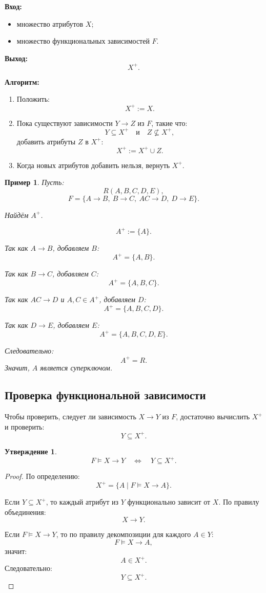 \documentclass[12pt,a4paper]{article}
\newtheorem{proposition}{Утверждение}[section]
\newtheorem{example}{Пример}[section]
\theoremstyle{remark}
\begin{document}
\textbf{Вход:}
\begin{itemize}
    \item множество атрибутов $X$;
    \item множество функциональных зависимостей $F$.
\end{itemize}

\textbf{Выход:}
\[
X^+.
\]

\textbf{Алгоритм:}
\begin{enumerate}
    \item Положить:
    \[
    X^+ := X.
    \]
    \item Пока существуют зависимости $Y \to Z$ из $F$, такие что:
    \[
    Y \subseteq X^+
    \quad \text{и} \quad
    Z \nsubseteq X^+,
    \]
    добавить атрибуты $Z$ в $X^+$:
    \[
    X^+ := X^+ \cup Z.
    \]
    \item Когда новых атрибутов добавить нельзя, вернуть $X^+$.
\end{enumerate}

\begin{example}
Пусть:
\[
R(A,B,C,D,E),
\]
\[
F = \{A \to B,\ B \to C,\ AC \to D,\ D \to E\}.
\]

Найдём $A^+$.

\[
A^+ := \{A\}.
\]

Так как $A \to B$, добавляем $B$:
\[
A^+ = \{A,B\}.
\]

Так как $B \to C$, добавляем $C$:
\[
A^+ = \{A,B,C\}.
\]

Так как $AC \to D$ и $A,C \in A^+$, добавляем $D$:
\[
A^+ = \{A,B,C,D\}.
\]

Так как $D \to E$, добавляем $E$:
\[
A^+ = \{A,B,C,D,E\}.
\]

Следовательно:
\[
A^+ = R.
\]
Значит, $A$ является суперключом.
\end{example}

\subsection{Проверка функциональной зависимости}

Чтобы проверить, следует ли зависимость $X \to Y$ из $F$, достаточно вычислить $X^+$ и проверить:
\[
Y \subseteq X^+.
\]

\begin{proposition}
\[
F \models X \to Y
\quad \Longleftrightarrow \quad
Y \subseteq X^+.
\]
\end{proposition}

\begin{proof}
По определению:
\[
X^+ = \{A \mid F \models X \to A\}.
\]

Если $Y \subseteq X^+$, то каждый атрибут из $Y$ функционально зависит от $X$. По правилу объединения:
\[
X \to Y.
\]

Если $F \models X \to Y$, то по правилу декомпозиции для каждого $A \in Y$:
\[
F \models X \to A,
\]
значит:
\[
A \in X^+.
\]
Следовательно:
\[
Y \subseteq X^+.
\]
\end{proof}
\end{document}
